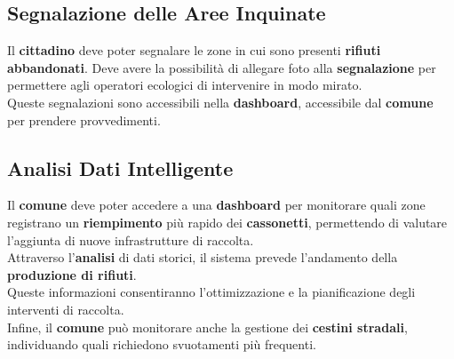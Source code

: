 \subsection{Segnalazione delle Aree Inquinate}
\begin{itemize}
Il \textbf{cittadino} deve poter segnalare le zone in cui sono presenti \textbf{rifiuti abbandonati}. Deve avere la possibilità di allegare foto alla \textbf{segnalazione} per permettere agli operatori ecologici di intervenire in modo mirato.
\\Queste segnalazioni sono accessibili nella \textbf{dashboard}, accessibile dal \textbf{comune} per prendere provvedimenti.
\end{itemize}

\subsection{Analisi Dati Intelligente}
\begin{itemize}
    Il \textbf{comune} deve poter accedere a una \textbf{dashboard} per monitorare quali zone registrano un \textbf{riempimento} più rapido dei \textbf{cassonetti}, permettendo di valutare l'aggiunta di nuove infrastrutture di raccolta.\\
Attraverso l’\textbf{analisi} di dati storici, il sistema prevede l’andamento della \textbf{produzione di rifiuti}.\\Queste informazioni consentiranno l'ottimizzazione e la pianificazione degli interventi di raccolta.
\\Infine, il \textbf{comune} può monitorare anche la gestione dei \textbf{cestini stradali}, individuando quali richiedono svuotamenti più frequenti.

\end{itemize}